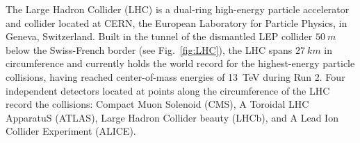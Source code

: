 The Large Hadron Collider (LHC) \cite{LHCTDR} is a dual-ring high-energy particle accelerator and collider located at CERN, the European Laboratory for Particle Physics, in Geneva, Switzerland. Built in the tunnel of the dismantled LEP collider $\SI{50}{m}$ below the Swiss-French border (see Fig.~\ref{fig:LHC}), the LHC spans $\SI{27}{km}$ in circumference and currently holds the world record for the highest-energy particle collisions, having reached center-of-mass energies of \SI{13}{TeV} during Run 2. Four independent detectors located at points along the circumference of the LHC record the collisions: Compact Muon Solenoid (CMS), A Toroidal LHC ApparatuS (ATLAS), Large Hadron Collider beauty (LHCb), and A Lead Ion Collider Experiment (ALICE).

\begin{figure}[H]
    \centering
\end{figure}
